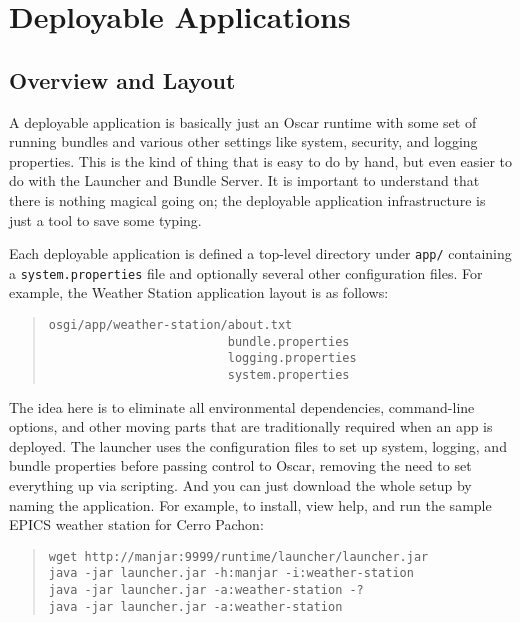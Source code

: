 \documentclass{report}
\begin{document}
\section{Deployable Applications}
\label{build-applications}

\subsection{Overview and Layout}
A deployable application is basically just an Oscar runtime with some set of running bundles and
various other settings like system, security, and logging properties. This is the kind of thing that
is easy to do by hand, but even easier to do with the Launcher and Bundle Server. It is important
to understand that there is nothing magical going on; the deployable application infrastructure
is just a tool to save some typing.

Each deployable application is defined a top-level directory under {\tt app/} containing
a {\tt system.properties} file and optionally several other configuration files. For
example, the Weather Station application layout is as follows:
\begin{quote}\begin{scriptsize}\begin{verbatim}
osgi/app/weather-station/about.txt
                         bundle.properties
                         logging.properties
                         system.properties
\end{verbatim}\end{scriptsize}\end{quote}
\noindent The idea here is to eliminate all environmental dependencies, command-line options, and
other moving parts that are traditionally required when an app is deployed. The launcher
uses the configuration files to set up system, logging, and bundle properties before 
passing control to Oscar, removing the need to set everything up via scripting. And you can just
download the whole setup by naming the application. For example, to install, view help,
 and run the sample EPICS weather station for Cerro Pachon:

\begin{quote}\begin{scriptsize}\begin{verbatim}
wget http://manjar:9999/runtime/launcher/launcher.jar
java -jar launcher.jar -h:manjar -i:weather-station
java -jar launcher.jar -a:weather-station -?
java -jar launcher.jar -a:weather-station
\end{verbatim}\end{scriptsize}\end{quote}
\end{document}
